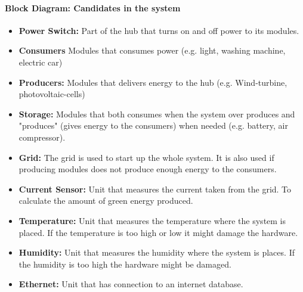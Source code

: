 			\paragraph{Block Diagram: Candidates in the system}
			\begin{itemize}
				\item \textbf{Power Switch:} Part of the hub that turns on and off power to its modules.
				\item \textbf{Consumers} Modules that consumes power (e.g. light, washing machine, electric car)
				\item \textbf{Producers:} Modules that delivers energy to the hub (e.g. Wind-turbine, photovoltaic-cells)
				\item \textbf{Storage:} Modules that both consumes when the system over produces and "produces" (gives energy to the consumers) 
				when needed (e.g. battery, air compressor). 
				\item \textbf{Grid:} The grid is used to start up the whole system. It is also used if producing modules does not produce 
				enough energy to the consumers.
				\item \textbf{Current Sensor:} Unit that measures the current taken from the grid. To calculate the amount of green energy produced.
				\item \textbf{Temperature:} Unit that measures the temperature where the system is placed. If the temperature is too high or 
				low it might damage the hardware.
				\item \textbf{Humidity:} Unit that measures the humidity where the system is places. If the humidity is too high the 
				hardware might be damaged.
				\item \textbf{Ethernet:} Unit that has connection to an internet database.

			\end{itemize}
